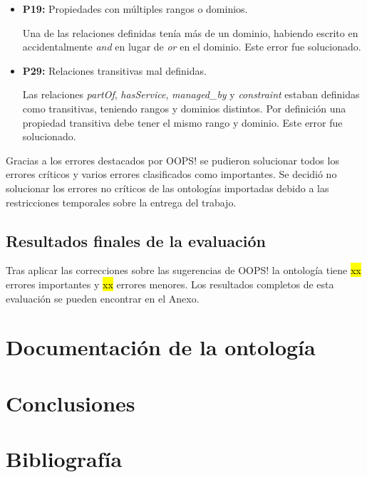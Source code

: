 \documentclass[a4paper,12pt]{article}
\begin{document}
	\begin{itemize}
		\item \textbf{P19:} Propiedades con múltiples rangos o dominios.
		
		Una de las relaciones definidas tenía más de un dominio, habiendo escrito en  accidentalmente \textit{and} en lugar de \textit{or} en el dominio. Este error fue solucionado.
		\item \textbf{P29:} Relaciones transitivas mal definidas.
		
		Las relaciones \textit{partOf}, \textit{hasService}, \textit{managed\_by} y \textit{constraint} estaban definidas como transitivas, teniendo rangos y dominios distintos. Por definición una propiedad transitiva debe tener el mismo rango y dominio. Este error fue solucionado.
	\end{itemize}
	
	Gracias a los errores destacados por OOPS! se pudieron solucionar todos los errores críticos y varios errores clasificados como importantes. Se decidió no solucionar los errores no críticos de las ontologías importadas debido a las restricciones temporales sobre la entrega del trabajo.
	
	\subsection{Resultados finales de la evaluación}
	
	Tras aplicar las correcciones sobre las sugerencias de OOPS! la ontología tiene \hl{xx} errores importantes y \hl{xx} errores menores.
	Los resultados completos de esta evaluación se pueden encontrar en el Anexo.
	
	\section{Documentación de la ontología}
		
	\cite{widoco}
	
	
	\section{Conclusiones}
	
	
\newpage
	\section*{Bibliografía}
	
	
	
\end{document}
